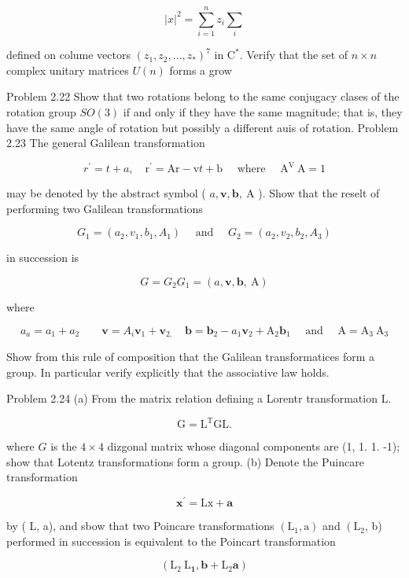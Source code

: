 $$
|x|^2=\sum_{i=1}^n z_i \sum_i
$$

defined on colume vectors $\left(z_1, z_2, \ldots, z_*\right)^7$ in $\mathrm{C}^*$. Verify that the set of $n \times n$ complex unitary matrices $U(n)$ forms a grow

Problem 2.22 Show that two rotations belong to the same conjugacy clases of the rotation group $S O(3)$ if and only if they have the same magnitude; that is, they have the same angle of rotation but possibly a different auis of rotation.
Problem 2.23 The general Galilean transformation

$$
r^{\prime}=t+a, \quad \mathrm{r}^{\prime}=\mathrm{Ar}-\mathrm{v} t+\mathrm{b} \quad \text { where } \quad \mathrm{A}^{\mathrm{V}} \mathrm{~A}=1
$$

may be denoted by the abstract symbol ( $a, \mathbf{v}, \mathbf{b}, \mathrm{~A}$ ). Show that the reselt of performing two Galilean transformations

$$
G_1=\left(a_2, v_1, b_1, A_1\right) \quad \text { and } \quad G_2=\left(a_2, v_2, b_2, A_3\right)
$$

in succession is

$$
G=G_2 G_1=(a, \mathbf{v}, \mathbf{b}, \mathrm{~A})
$$

where

$$
a_a=a_1+a_2 \quad \quad \mathbf{v}=A_i \mathbf{v}_1+\mathbf{v}_{2,} \quad \mathbf{b}=\mathbf{b}_2-a_1 \mathbf{v}_2+\mathrm{A}_2 \mathbf{b}_1 \quad \text { and } \quad \mathrm{A}=\mathrm{A}_3 \mathrm{~A}_3
$$


Show from this rule of composition that the Galilean transformatices form a group. In particular verify explicitly that the associative law holds.

Problem 2.24 (a) From the matrix relation defining a Lorentr transformation L.

$$
\mathrm{G}=\mathrm{L}^{\mathrm{T}} \mathrm{GL} .
$$

where $G$ is the $4 \times 4$ dizgonal matrix whose diagonal components are (1, 1. 1. -1); show that Lotentz transformations form a group.
(b) Denote the Puincare transformation

$$
\mathbf{x}^{\prime}=\mathrm{Lx}+\mathbf{a}
$$

by ( L, a), and sbow that two Poincare transformations $\left(\mathrm{L}_1, \mathrm{a}\right)$ and $\left(\mathrm{L}_2\right.$, b) performed in succession is equivalent to the Poincart transformation

$$
\left(\mathrm{L}_2 \mathrm{~L}_{\mathbf{1}}, \mathbf{b}+\mathrm{L}_2 \mathbf{a}\right)
$$

